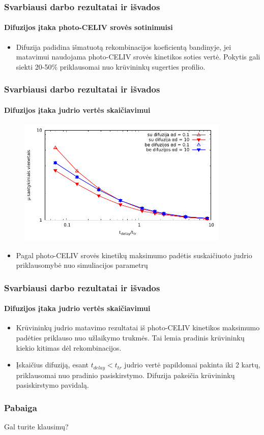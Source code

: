 \documentclass{beamer}
\begin{document}
  \begin{frame}
    \frametitle{Svarbiausi darbo rezultatai ir išvados}
    \framesubtitle{Difuzijos įtaka photo-CELIV srovės sotinimuisi}
    \begin{itemize}
		\item Difuzija padidina išmatuotą rekombinacijos koeficientą bandinyje, jei matavimui naudojama photo-CELIV srovės kinetikos soties vertė. Pokytis gali siekti 20-50\% priklausomai nuo krūvininkų sugerties profilio.
    \end{itemize}
  \end{frame}
  
  \begin{frame}
    \frametitle{Svarbiausi darbo rezultatai ir išvados}
    \framesubtitle{Difuzijos įtaka judrio vertės skaičiavimui}
    \begin{figure}
    	\includegraphics[width=0.9\textwidth]{./media/pdf/log_mobility.pdf}
    \end{figure}
    \begin{itemize}
    \item Pagal photo-CELIV srovės kinetikų maksimumo padėtis suskaičiuoto judrio priklausomybė nuo simuliacijos parametrų
    \end{itemize}
  \end{frame}

  \begin{frame}
    \frametitle{Svarbiausi darbo rezultatai ir išvados}
    \framesubtitle{Difuzijos įtaka judrio vertės skaičiavimui}
    \begin{itemize}
      \item Krūvininkų judrio matavimo rezultatai iš photo-CELIV kinetikos maksimumo padėties priklauso nuo užlaikymo trukmės. Tai lemia pradinis krūvininkų kiekio kitimas dėl rekombinacijos.
      \item Įskaičius difuziją, esant $t_{delay} < t_{tr}$ judrio vertė papildomai pakinta iki 2 kartų, priklausomai nuo pradinio pasiskirstymo. Difuzija pakeičia krūvininkų pasiskirstymo pavidalą.
    \end{itemize}
  \end{frame}
  
  \begin{frame}
  \frametitle{Pabaiga}
  Gal turite klausimų?
  \end{frame}
  
\end{document}
